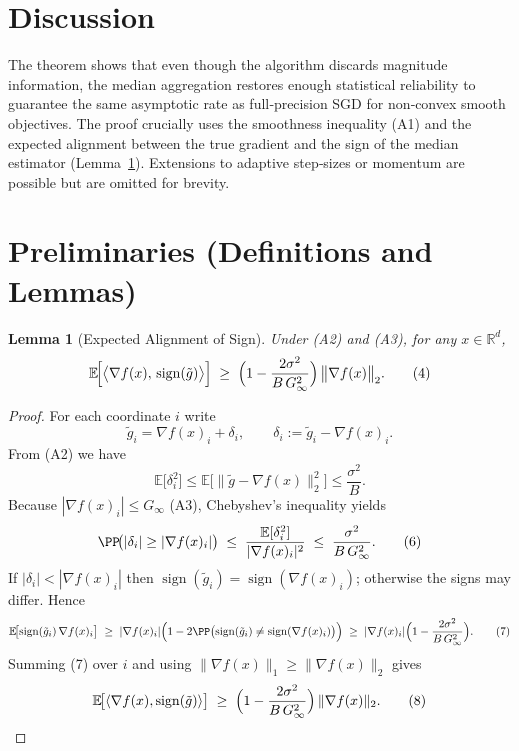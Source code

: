 \documentclass{article}
\newtheorem{lemma}{Lemma}
\newcommand{\sign}{\operatorname{sign}}
\newcommand{\EE}{\mathbb{E}}
\newcommand{\RR}{\mathbb{R}}
\begin{document}
\section*{Discussion}
The theorem shows that even though the algorithm discards magnitude information,
the median aggregation restores enough statistical reliability to guarantee the same
asymptotic rate as full‑precision SGD for non‑convex smooth objectives.  The proof crucially
uses the smoothness inequality (A1) and the expected alignment between the true gradient
and the sign of the median estimator (Lemma~\ref{lem:sign-align}).  Extensions to
adaptive step‑sizes or momentum are possible but are omitted for brevity.

\newpage

\section*{Preliminaries (Definitions and Lemmas)}
\begin{lemma}[Expected Alignment of Sign]\label{lem:sign-align}
Under (A2) and (A3), for any $x\in\RR^{d}$,
\[
\EE\!\Bigl[\big\langle \nabla f(x),\,\sign(\tilde g)\big\rangle\Bigr]
\;\ge\;
\Bigl(1-\frac{2\sigma^{2}}{B\,G_{\infty}^{2}}\Bigr)\,
\bigl\|\nabla f(x)\bigr\|_{2}.
\tag{4}
\]
\end{lemma}
\begin{proof}
For each coordinate $i$ write
\[
\tilde g_{i}= \nabla f(x)_{i}+ \delta_{i},
\qquad
\delta_{i}:=\tilde g_{i}-\nabla f(x)_{i}.
\]
From (A2) we have
\[
\EE\!\bigl[\delta_{i}^{2}\bigr]\le
\EE\!\bigl[\|\tilde g-\nabla f(x)\|_{2}^{2}\bigr]\le\frac{\sigma^{2}}{B}.
\tag{5}
\]
Because $|\nabla f(x)_{i}|\le G_{\infty}$ (A3), Chebyshev’s inequality yields
\[
\PP\!\bigl(|\delta_{i}|\ge |\nabla f(x)_{i}|\bigr)
\;\le\;
\frac{\EE[\delta_{i}^{2}]}{|\nabla f(x)_{i}|^{2}}
\;\le\;
\frac{\sigma^{2}}{B\,G_{\infty}^{2}} .
\tag{6}
\]
If $|\delta_{i}|<|\nabla f(x)_{i}|$ then $\sign(\tilde g_{i})=\sign(\nabla f(x)_{i})$; otherwise the signs may differ.
Hence
\[
\EE\!\bigl[\sign(\tilde g_{i})\,\nabla f(x)_{i}\bigr]
\;\ge\;
|\nabla f(x)_{i}|\Bigl(1-2\PP\bigl(\sign(\tilde g_{i})\neq\sign(\nabla f(x)_{i})\bigr)\Bigr)
\;\ge\;
|\nabla f(x)_{i}|\Bigl(1-\frac{2\sigma^{2}}{B\,G_{\infty}^{2}}\Bigr).
\tag{7}
\]
Summing (7) over $i$ and using $\|\nabla f(x)\|_{1}\ge\|\nabla f(x)\|_{2}$ gives
\[
\EE\!\bigl[\langle \nabla f(x),\sign(\tilde g)\rangle\bigr]
\;\ge\;
\Bigl(1-\frac{2\sigma^{2}}{B\,G_{\infty}^{2}}\Bigr)\,
\|\nabla f(x)\|_{2}.
\tag{8}
\]
\end{proof}
\end{document}
